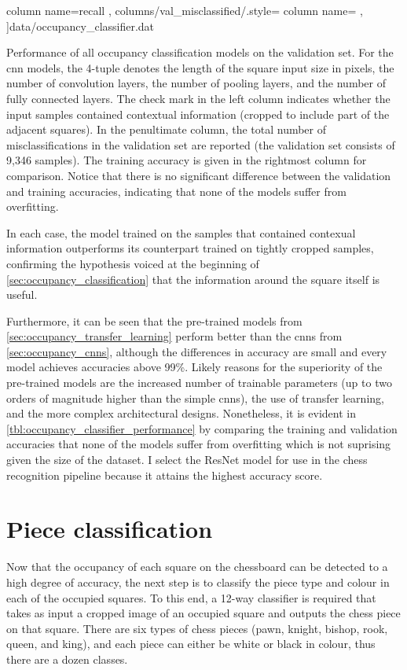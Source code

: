 \documentclass[../report.tex]{subfiles}
\begin{document}
\begin{table}
{{                column name={recall}
            },
            columns/val_misclassified/.style={
                column name={}
            },
        ]{data/occupancy_classifier.dat}
    }
    \caption[Performance of all occupancy classification models on the validation set.]{
        Performance of all occupancy classification models on the validation set.
        For the \gls{cnn} models, the 4-tuple denotes the length of the square input size in pixels, the number of convolution layers, the number of pooling layers, and the number of fully connected layers.
        The check mark in the left column indicates whether the input samples contained contextual information (cropped to include part of the adjacent squares).
        In the penultimate column, the total number of misclassifications in the validation set are reported (the validation set consists of 9,346 samples).
        The training accuracy is given in the rightmost column for comparison.
        Notice that there is no significant difference between the validation and training accuracies, indicating that none of the models suffer from overfitting.
    }
    \label{tbl:occupancy_classifier_performance}
\end{table}
In each case, the model trained on the samples that contained contexual information outperforms its counterpart trained on tightly cropped samples, confirming the hypothesis voiced at the beginning of \cref{sec:occupancy_classification} that the information around the square itself is useful.

Furthermore, it can be seen that the pre-trained models from \cref{sec:occupancy_transfer_learning} perform better than the \glspl{cnn} from \cref{sec:occupancy_cnns}, although the differences in accuracy are small and every model achieves accuracies above 99\%.
Likely reasons for the superiority of the pre-trained models are the increased number of trainable parameters (up to two orders of magnitude higher than the simple \glspl{cnn}), the use of transfer learning, and the more complex architectural designs.
Nonetheless, it is evident in \cref{tbl:occupancy_classifier_performance} by comparing the training and validation accuracies that none of the models suffer from overfitting which is not suprising given the size of the dataset.
I select the ResNet model for use in the chess recognition pipeline because it attains the highest accuracy score.


\section{Piece classification}
\label{sec:piece_classification}
Now that the occupancy of each square on the chessboard can be detected to a high degree of accuracy, the next step is to classify the piece type and colour in each of the occupied squares.
To this end, a 12-way classifier is required that takes as input a cropped image of an occupied square and outputs the chess piece on that square. 
There are six types of chess pieces (pawn, knight, bishop, rook, queen, and king), and each piece can either be white or black in colour, thus there are a dozen classes.
\end{document}
